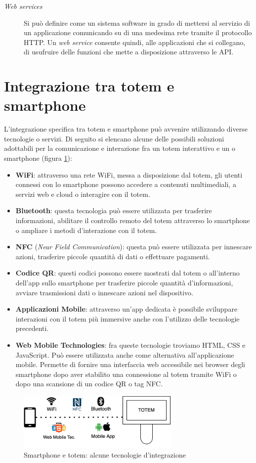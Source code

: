 \begin{description}
    \item [\textit{Web services}] Si può definire come un sistema software in grado di mettersi al servizio di un applicazione comunicando su di una medesima rete tramite il protocollo HTTP. Un \textit{web service} consente quindi, alle applicazioni che si collegano, di usufruire delle funzioni che mette a disposizione attraverso le API.
\end{description}

\section{Integrazione tra totem e smartphone}
L'integrazione specifica tra totem e smartphone può avvenire utilizzando diverse tecnologie o servizi. Di seguito si elencano alcune delle possibili soluzioni adottabili per la comunicazione e interazione fra un totem interattivo e un o smartphone (figura \ref{fig:totem-phone-tech}):

\begin{itemize}
    \item \textbf{WiFi}: attraverso una rete WiFi, messa a disposizione dal totem, gli utenti connessi con lo smartphone possono accedere a contenuti multimediali, a servizi web e cloud o interagire con il totem.
    \item \textbf{Bluetooth}: questa tecnologia può essere utilizzata per trasferire informazioni, abilitare il controllo remoto del totem attraverso lo smartphone o ampliare i metodi d'interazione con il totem.
    \item \textbf{NFC} (\textit{Near Field Communication}): questa può essere utilizzata per innescare azioni, trasferire piccole quantità di dati o effettuare pagamenti.
    \item \textbf{Codice QR}: questi codici possono essere mostrati dal totem o all'interno dell'app sullo smartphone per trasferire piccole quantità d'informazioni, avviare trasmissioni dati o innescare azioni nel dispositivo.
    \item \textbf{Applicazioni Mobile}: attraverso un'app dedicata è possibile sviluppare interazioni con il totem più immersive anche con l'utilizzo delle tecnologie precedenti.
    \item \textbf{Web Mobile Technologies}: fra queste tecnologie troviamo HTML, CSS e JavaScript. Può essere utilizzata anche come alternativa all'applicazione mobile. Permette di fornire una interfaccia web accessibile nei browser degli smartphone dopo aver stabilito una connessione al totem tramite WiFi o dopo una scansione di un codice QR o tag NFC.
\end{itemize}



\begin{figure}
    \centering
    \includegraphics[width=0.7\textwidth]{img/totem-smartphone-tecnologies.png}
    \caption{Smartphone e totem: alcune tecnologie d'integrazione}
    \label{fig:totem-phone-tech}
\end{figure}


